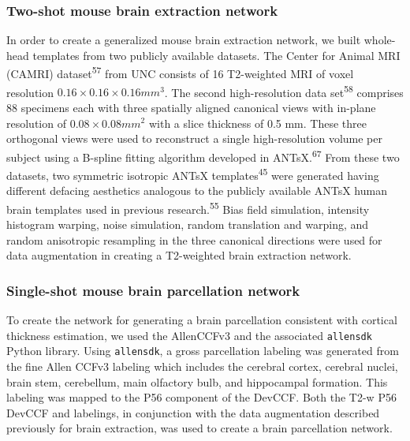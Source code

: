\documentclass[
  12pt,
]{article}
\begin{document}
\hypertarget{two-shot-mouse-brain-extraction-network}{%
\subsubsection{Two-shot mouse brain extraction
network}\label{two-shot-mouse-brain-extraction-network}}

In order to create a generalized mouse brain extraction network, we
built whole-head templates from two publicly available datasets. The
Center for Animal MRI (CAMRI) dataset\textsuperscript{57} from UNC
consists of 16 T2-weighted MRI of voxel resolution
\(0.16 \times 0.16 \times 0.16 mm^3\). The second high-resolution data
set\textsuperscript{58} comprises 88 specimens each with three spatially
aligned canonical views with in-plane resolution of
\(0.08 \times 0.08 mm^2\) with a slice thickness of 0.5 mm. These three
orthogonal views were used to reconstruct a single high-resolution
volume per subject using a B-spline fitting algorithm developed in
ANTsX.\textsuperscript{67} From these two datasets, two symmetric
isotropic ANTsX templates\textsuperscript{45} were generated having
different defacing aesthetics analogous to the publicly available ANTsX
human brain templates used in previous research.\textsuperscript{55}
Bias field simulation, intensity histogram warping, noise simulation,
random translation and warping, and random anisotropic resampling in the
three canonical directions were used for data augmentation in creating a
T2-weighted brain extraction network.

\hypertarget{single-shot-mouse-brain-parcellation-network}{%
\subsubsection{Single-shot mouse brain parcellation
network}\label{single-shot-mouse-brain-parcellation-network}}

To create the network for generating a brain parcellation consistent
with cortical thickness estimation, we used the AllenCCFv3 and the
associated \texttt{allensdk} Python library. Using \texttt{allensdk}, a
gross parcellation labeling was generated from the fine Allen CCFv3
labeling which includes the cerebral cortex, cerebral nuclei, brain
stem, cerebellum, main olfactory bulb, and hippocampal formation. This
labeling was mapped to the P56 component of the DevCCF. Both the T2-w
P56 DevCCF and labelings, in conjunction with the data augmentation
described previously for brain extraction, was used to create a brain
parcellation network.
\end{document}
